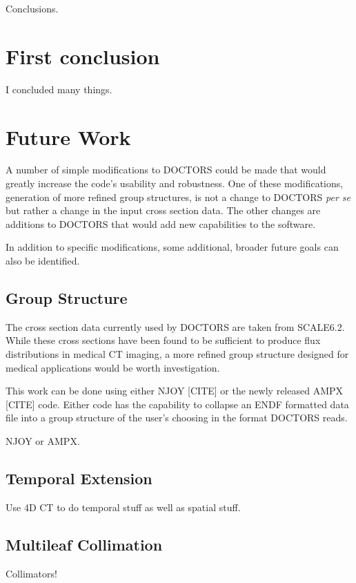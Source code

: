 


Conclusions.

\section{First conclusion}

I concluded many things.

\section{Future Work}

A number of simple modifications to DOCTORS could be made that would greatly increase the code's usability and robustness. One of these modifications, generation of more refined group structures, is not a change to DOCTORS \textit{per se} but rather a change in the input cross section data. The other changes are additions to DOCTORS that would add new capabilities to the software.

In addition to specific modifications, some additional, broader future goals can also be identified.

\subsection{Group Structure}

The cross section data currently used by DOCTORS are taken from SCALE6.2. While these cross sections have been found to be sufficient to produce flux distributions in medical CT imaging, a more refined group structure designed for medical applications would be worth investigation.

This work can be done using either NJOY [CITE] or the newly released AMPX [CITE] code. Either code has the capability to collapse an ENDF formatted data file into a group structure of the user's choosing in the format DOCTORS reads.



NJOY or AMPX.

\subsection{Temporal Extension}

Use 4D CT to do temporal stuff as well as spatial stuff.

\subsection{Multileaf Collimation}
Collimators!

\endinput
